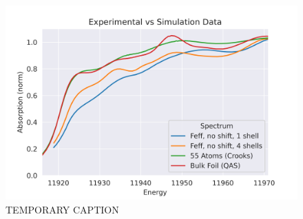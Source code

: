\begin{figure}[h]
	\centering
	\includegraphics[width=.7\linewidth]{Chapters/Figures/Bulk_55atom_experimental_theory_comparison.png}
	\caption[Simulation vs. Experimental 2]{TEMPORARY CAPTION}
	\label{fig:avg-experimental-vs-simulation2}
\end{figure}


